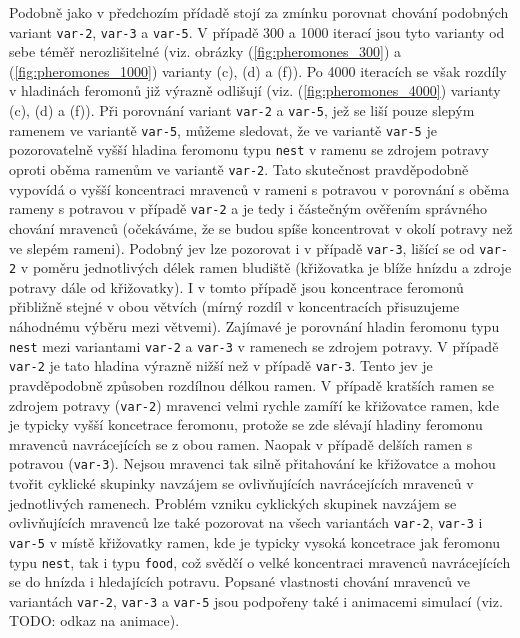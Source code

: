 \documentclass[10pt,a4paper,twocolumn]{article}
\begin{document}
Podobně jako v předchozím přídadě stojí za zmínku porovnat chování
podobných variant \texttt{var-2}, \texttt{var-3} a \texttt{var-5}. 
V případě 300 a 1000 iterací jsou tyto varianty od sebe téměř 
nerozlišitelné (viz. obrázky (\ref{fig:pheromones_300}) a 
(\ref{fig:pheromones_1000}) varianty (c), (d) a (f)). Po 4000
iteracích se však rozdíly v hladinách feromonů již výrazně 
odlišují (viz. (\ref{fig:pheromones_4000}) varianty (c), (d) a (f)).
Při porovnání variant \texttt{var-2} a \texttt{var-5}, jež se liší
pouze slepým ramenem ve variantě \texttt{var-5}, můžeme sledovat, že
ve variantě \texttt{var-5} je pozorovatelně vyšší hladina feromonu
typu \texttt{nest} v ramenu se zdrojem potravy oproti oběma ramenům
ve variantě \texttt{var-2}. Tato skutečnost pravděpodobně vypovídá
o vyšší koncentraci mravenců v rameni s potravou v porovnání s oběma
rameny s potravou v případě \texttt{var-2} a je tedy i částečným 
ověřením správného chování mravenců (očekáváme, že se budou 
spíše koncentrovat v okolí potravy než ve slepém rameni). Podobný jev
lze pozorovat i v případě \texttt{var-3}, lišící se od \texttt{var-2}
v poměru jednotlivých délek ramen bludiště (křižovatka je blíže 
hnízdu a zdroje potravy dále od křižovatky). I v tomto případě jsou
koncentrace feromonů přibližně stejné v obou větvích (mírný rozdíl 
v koncentracích přisuzujeme náhodnému výběru mezi větvemi). Zajímavé
je porovnání hladin feromonu typu \texttt{nest} mezi variantami 
\texttt{var-2} a \texttt{var-3} v ramenech se zdrojem potravy. 
V případě \texttt{var-2} je tato hladina výrazně nižší než v případě
\texttt{var-3}. Tento jev je pravděpodobně způsoben rozdílnou délkou 
ramen. V případě kratších ramen se zdrojem potravy 
(\texttt{var-2}) mravenci velmi rychle zamíří ke křižovatce ramen,
kde je typicky vyšší koncetrace feromonu, protože se zde slévají
hladiny feromonu mravenců navrácejících se z obou ramen. Naopak v 
případě delších ramen s potravou (\texttt{var-3}). Nejsou mravenci
tak silně přitahování ke křižovatce a mohou tvořit cyklické skupinky
navzájem se ovlivňujících navrácejících mravenců v jednotlivých 
ramenech. Problém vzniku cyklických skupinek navzájem se ovlivňujících
mravenců lze také pozorovat na všech variantách \texttt{var-2}, 
\texttt{var-3} i \texttt{var-5} v místě křižovatky ramen, kde je typicky
vysoká koncetrace jak feromonu typu \texttt{nest}, tak i typu 
\texttt{food}, což svědčí o velké koncentraci mravenců navrácejících
se do hnízda i hledajících potravu. Popsané vlastnosti chování mravenců
ve variantách \texttt{var-2}, \texttt{var-3} a \texttt{var-5} jsou
podpořeny také i animacemi simulací (viz. TODO: odkaz na animace).
\end{document}
